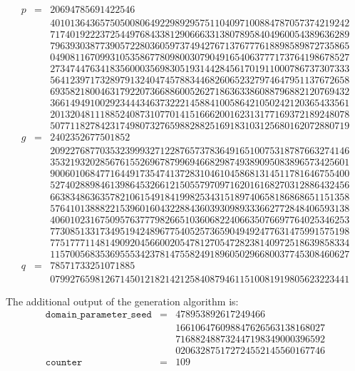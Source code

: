 \documentclass[a4paper]{article}
\begin{document}
\[
\begin{array}{lcr}
p&=&20694785691422546\\
&&401013643657505008064922989295751104097100884787057374219242\\
&&717401922237254497684338129066633138078958404960054389636289\\
&&796393038773905722803605973749427671376777618898589872735865\\
&&049081167099310535867780980030790491654063777173764198678527\\
&&273474476341835600035698305193144284561701911000786737307333\\
&&564123971732897913240474578834468260652327974647951137672658\\
&&693582180046317922073668860052627186363386088796882120769432\\
&&366149491002923444346373222145884100586421050242120365433561\\
&&201320481118852408731077014151666200162313177169372189248078\\
&&507711827842317498073276598828825169183103125680162072880719\\
g&=&2402352677501852\\
&&209227687703532399932712287657378364916510075318787663274146\\
&&353219320285676155269678799694668298749389095083896573425601\\
&&900601068477164491735474137283104610458681314511781646755400\\
&&527402889846139864532661215055797097162016168270312886432456\\
&&663834863635782106154918419982534315189740658186868651151358\\
&&576410138882215396016043228843603930989333662772848406593138\\
&&406010231675095763777982665103606822406635076697764025346253\\
&&773085133173495194248967754052573659049492477631475991575198\\
&&775177711481490920456600205478127054728238140972518639858334\\
&&115700568353695553423781475582491896050296680037745308460627\\
q&=&78571733251071885\\
&&079927659812671450121821421258408794611510081919805623223441
\end{array}
\]

The additional output of the generation algorithm is:
\[
\begin{array}{lcr}
\texttt{domain\_parameter\_seed}&=&478953892617249466\\
&&166106476098847626563138168027\\
&&716882488732447198349000396592\\
&&020632875172724552145560167746\\
\texttt{counter}&=&109
\end{array}
\]
\end{document}

